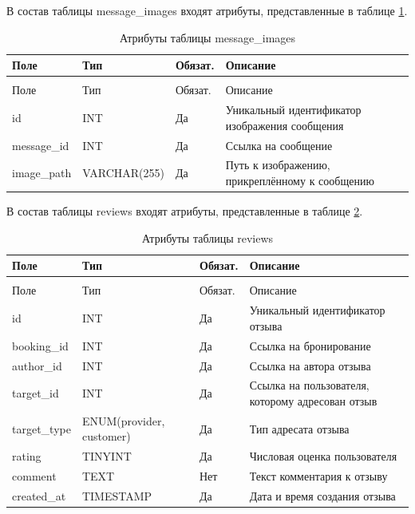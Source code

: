 В состав таблицы message\_images входят атрибуты, представленные в таблице \ref{messageimages:table}.

\begin{longtable}{|>{\raggedright\arraybackslash}p{3.8cm}|>{\raggedright\arraybackslash}p{3.8cm}|>{\centering\arraybackslash}p{2.0cm}|>{\raggedright\arraybackslash}p{5.4cm}|}
	\caption{Атрибуты таблицы message\_images}\label{messageimages:table} \\ \hline
	\centering Поле & \centering Тип & \centering Обязат. & \centering\arraybackslash Описание \\ \hline
	\endfirsthead
	\multicolumn{4}{l}{Продолжение таблицы \ref{messageimages:table}} \\ \hline
	\centering Поле & \centering Тип & \centering Обязат. & \centering\arraybackslash Описание \\ \hline
	\endhead
	id & INT & Да & Уникальный идентификатор изображения сообщения \\ \hline
	message\_id & INT & Да & Ссылка на сообщение \\ \hline
	image\_path & VARCHAR(255) & Да & Путь к изображению, прикреплённому к сообщению \\ \hline
\end{longtable}

В состав таблицы reviews входят атрибуты, представленные в таблице \ref{reviews:table}.

\begin{longtable}{|>{\raggedright\arraybackslash}p{3.8cm}|>{\raggedright\arraybackslash}p{3.8cm}|>{\centering\arraybackslash}p{2.0cm}|>{\raggedright\arraybackslash}p{5.4cm}|}
	\caption{Атрибуты таблицы reviews}\label{reviews:table} \\ \hline
	\centering Поле & \centering Тип & \centering Обязат. & \centering\arraybackslash Описание \\ \hline
	\endfirsthead
	\multicolumn{4}{l}{Продолжение таблицы \ref{reviews:table}} \\ \hline
	\centering Поле & \centering Тип & \centering Обязат. & \centering\arraybackslash Описание \\ \hline
	\endhead
	id & INT & Да & Уникальный идентификатор отзыва \\ \hline
	booking\_id & INT & Да & Ссылка на бронирование \\ \hline
	author\_id & INT & Да & Ссылка на автора отзыва \\ \hline
	target\_id & INT & Да & Ссылка на пользователя, которому адресован отзыв \\ \hline
	target\_type & ENUM(provider, customer) & Да & Тип адресата отзыва \\ \hline
	rating & TINYINT & Да & Числовая оценка пользователя \\ \hline
	comment & TEXT & Нет & Текст комментария к отзыву \\ \hline
	created\_at & TIMESTAMP & Да & Дата и время создания отзыва \\ \hline
\end{longtable}

